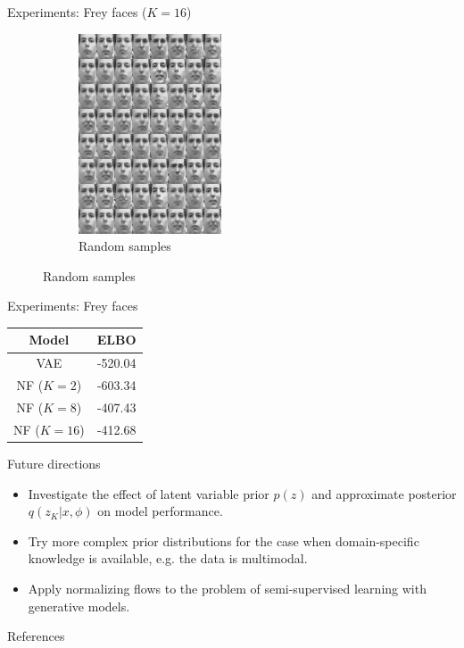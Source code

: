 \documentclass[unicode,11pt]{beamer}
\begin{document}
\begin{frame}[fragile]{Experiments: Frey faces ($K = 16$)}
\begin{figure}
\begin{subfigure}[b]{.4\linewidth}
      \includegraphics[width=.8\linewidth]{images/nf_frey_B400_E8000_N560_L2_H200_F16_C_sample_64}
      \caption{Random samples}
    \end{subfigure}
  \end{figure}
\end{frame}


\begin{frame}[fragile]{Experiments: Frey faces}
  \begin{center}
    \begin{tabular}{cc}
      \textbf{Model} & \textbf{ELBO}    \\
      \hline
      VAE           & -520.04 \\
      NF ($K = 2$)  & -603.34 \\
      NF ($K = 8$)  & -407.43 \\
      NF ($K = 16$) & -412.68
    \end{tabular}
  \end{center}
\end{frame}

\begin{frame}[fragile]{Future directions}
  \begin{itemize}
  \item Investigate the effect of latent variable prior $p(z)$ and approximate
    posterior $q(z_K|x, \phi)$ on model performance.
  \item Try more complex prior distributions for the case when domain-specific
    knowledge is available, e.g. the data is multimodal.
  \item Apply normalizing flows to the problem of semi-supervised learning
    with generative models.
  \end{itemize}
\end{frame}


\begin{frame}[noframenumbering]{References}
  
  
\end{frame}
\end{document}
